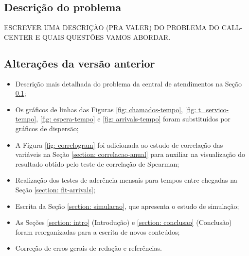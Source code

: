 \subsection{Descrição do problema}
\label{section: descricao}
ESCREVER UMA DESCRIÇÃO (PRA VALER) DO PROBLEMA DO CALL-CENTER E QUAIS QUESTÕES VAMOS ABORDAR.

\subsection{Alterações da versão anterior}
\begin{itemize}
    \item Descrição mais detalhada do problema da central de atendimentos na Seção \ref*{section: descricao};
    \item Os gráficos de linhas das Figuras \ref*{fig: chamados-tempo}, \ref*{fig: t_servico-tempo}, \ref*{fig: espera-tempo} e \ref*{fig: arrivals-tempo} foram substituídos por gráficos de dispersão;
    \item A Figura \ref*{fig: correlogram} foi adicionada ao estudo de correlação das variáveis na Seção \ref*{section: correlacao-anual} para auxiliar na visualização do resultado obtido pelo teste de correlação de Spearman;
    \item Realização dos testes de aderência mensais para tempos entre chegadas na Seção \ref*{section: fit-arrivals};
    \item Escrita da Seção \ref*{section: simulacao}, que apresenta o estudo de simulação;
    \item As Seções \ref*{section: intro} (Introdução) e \ref*{section: conclusao} (Conclusão) foram reorganizadas para a escrita de novos conteúdos;
    \item Correção de erros gerais de redação e referências.
\end{itemize}